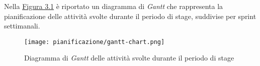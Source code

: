 \pagebreak
\noindent Nella {\hyperref[fig:gantt-chart]{Figura 3.1}} è riportato un diagramma di \textit{Gantt} che rappresenta la pianificazione delle attività svolte durante il periodo di stage, suddivise per \gls{sprint} settimanali.\\

\begin{figure}[H]
    \centering
    \texttt{[image: pianificazione/gantt-chart.png]}
    \caption{Diagramma di \textit{Gantt} delle attività svolte durante il periodo di stage}
    \label{fig:gantt-chart}
\end{figure}